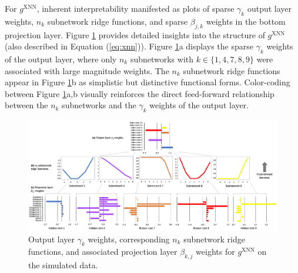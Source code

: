 \documentclass[information,article,accept,moreauthors,pdftex]{Definitions/mdpi}
\begin{document}
{{{For $g^\text{XNN}$, inherent interpretability manifested as plots of sparse $\gamma_k$ output layer weights, $n_k$ subnetwork ridge functions, and sparse $\beta_{j,k}$ weights in the bottom projection layer. Figure \ref{fig:sim_xnn_glob_ridge} provides detailed insights into the structure of $g^\text{XNN}$ (also described in Equation (\ref{eq:xnn})). Figure \ref{fig:sim_xnn_glob_ridge}{a} displays the sparse $\gamma_k$ weights of the output layer, where only $n_k$ subnetworks with $k \in \{1, 4, 7, 8, 9\}$ were associated with large magnitude weights. The $n_k$ subnetwork ridge functions appear in Figure \ref{fig:sim_xnn_glob_ridge}{b} as simplistic but distinctive functional forms. Color-coding between Figure \ref{fig:sim_xnn_glob_ridge}{a},{b} visually reinforces the direct feed-forward relationship between the $n_k$ subnetworks and the $\gamma_k$ weights of the output layer.%

\begin{figure}[H]
\centering
	\includegraphics[width=17cm]{img/sim_xnn_glob_ridge.png}
	\caption{Output layer $\gamma_k$ weights, corresponding $n_k$ subnetwork ridge functions, and associated projection layer $\beta_{k,j}$ weights for $g^\text{XNN}$ on the simulated data.}
	\label{fig:sim_xnn_glob_ridge}
\end{figure} 

}}}
\end{document}
